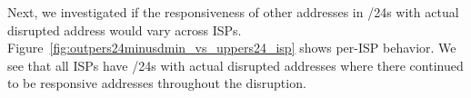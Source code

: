 Next, we investigated if the responsiveness of other addresses in /24s with actual disrupted address would vary across ISPs. Figure~\ref{fig:outpers24minusdmin_vs_uppers24_isp} shows per-ISP behavior. We see that all ISPs have /24s with actual disrupted addresses where there continued to be responsive addresses throughout the disruption.